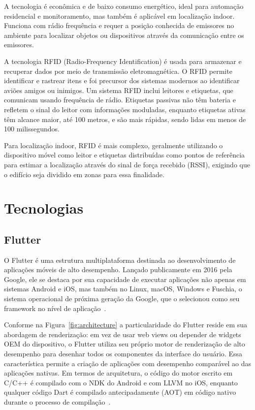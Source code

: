 A tecnologia é econômica e de baixo consumo energético, ideal para automação residencial e monitoramento, mas também é aplicável em localização indoor.
Funciona com rádio frequência e requer a posição conhecida de emissores no ambiente para localizar objetos ou dispositivos através da comunicação entre os emissores.

\label{subsubsubsec:rfid}
A tecnologia RFID (Radio-Frequency Identification) é usada para armazenar e recuperar dados por meio de transmissão eletromagnética.
O RFID permite identificar e rastrear itens e foi precursor dos sistemas modernos ao identificar aviões amigos ou inimigos.
Um sistema RFID inclui leitores e etiquetas, que comunicam usando frequência de rádio.
Etiquetas passivas não têm bateria e refletem o sinal do leitor com informações moduladas, enquanto etiquetas ativas têm alcance maior, até 100 metros, e são mais rápidas, sendo lidas em menos de 100 milissegundos.

Para localização indoor, RFID é mais complexo, geralmente utilizando o dispositivo móvel como leitor e etiquetas distribuídas como pontos de referência para estimar a localização através do sinal de força recebido (RSSI), exigindo que o edifício seja dividido em zonas para essa finalidade.


\section{Tecnologias}\label{sec: tecnologias}

\subsection{Flutter}\label{subsec: flutter}
O Flutter é uma estrutura multiplataforma destinada ao desenvolvimento de aplicações móveis de alto desempenho.
Lançado publicamente em 2016 pela Google, ele se destaca por sua capacidade de executar aplicações não apenas em sistemas Android e iOS, mas também no Linux, macOS, Windows e Fuschia, o sistema operacional de próxima geração da Google, que o selecionou como seu framework no nível de aplicação~\cite{wu2018react}.

Conforme na Figura~\ref{fig:architecture} a particularidade do Flutter reside em sua abordagem de renderização: em vez de usar web views ou depender de widgets OEM do dispositivo, o Flutter utiliza seu próprio motor de renderização de alto desempenho para desenhar todos os componentes da interface do usuário.
Essa característica permite a criação de aplicações com desempenho comparável ao das aplicações nativas.
Em termos de arquitetura, o código do motor escrito em C/C++ é compilado com o NDK do Android e com LLVM no iOS, enquanto qualquer código Dart é compilado antecipadamente (AOT) em código nativo durante o processo de compilação~\cite{flutter}.

